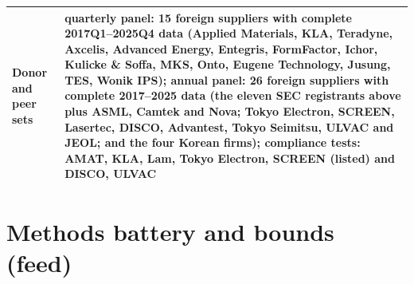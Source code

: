 \documentclass[12pt]{article}
\begin{document}
\begin{table}[htbp]
\begin{tabular}{@{}
  >{\raggedright\arraybackslash}p{}
  >{\raggedright\arraybackslash}p{}@{}}
\hdashline
Donor and peer sets & quarterly panel: 15 foreign suppliers with complete 2017Q1--2025Q4 data (Applied Materials, KLA, Teradyne, Axcelis, Advanced Energy, Entegris, FormFactor, Ichor, Kulicke \& Soffa, MKS, Onto, Eugene Technology, Jusung, TES, Wonik IPS); annual panel: 26 foreign suppliers with complete 2017--2025 data (the eleven SEC registrants above plus ASML, Camtek and Nova; Tokyo Electron, SCREEN, Lasertec, DISCO, Advantest, Tokyo Seimitsu, ULVAC and JEOL; and the four Korean firms); compliance tests: AMAT, KLA, Lam, Tokyo Electron, SCREEN (listed) and DISCO, ULVAC \\
\bottomrule
\end{tabular}\end{table}


\FloatBarrier{}
\section{Methods battery and bounds (feed)}
\end{document}
